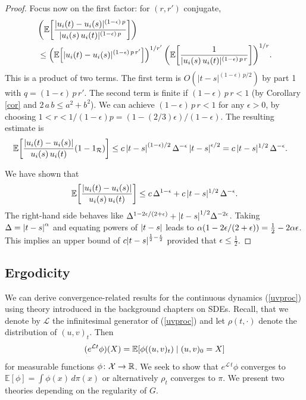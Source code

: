 \documentclass[11pt, twoside]{report}
\begin{document}
\begin{proof}
Focus now on the first factor: for $(r,r')$ conjugate,
\begin{align*}
&\pp{\mathbb{E} \bp{\frac {|u_i(t)-u_i(s)|^{(1-\epsilon)\,p}}{|u_i(s)\,u_i(t)|^{(1-\epsilon)\,p}}}}\\
&\le \pp{\mathbb{E} \bp{ {|u_i(t)-u_i(s)|^{(1-\epsilon)\,p\,r'}}}}^{1/r'}\, \pp{\mathbb{E} \bp{\frac {1}{|u_i(s)\,u_i(t)|^{(1-\epsilon)\,p \,r}}}}^{1/r}.
\end{align*}
This is a product of two terms. The first term is $O(|t-s|^{(1-\epsilon)\,p/2})$ by part 1 with  $q=(1-\epsilon)\,p\, r'$.
   The second term is finite if $(1-\epsilon) \,p\, r<1$ (by Corollary \ref{cor} and $2\,a\,b\le a^2+b^2$).
We can achieve $(1-\epsilon)\,p\,r<1$ for any $\epsilon>0$, by choosing $1<r<1/(1-\epsilon)p=(1-(2/3)\epsilon)/(1-\epsilon)$. The resulting estimate is
 \begin{align*}
  \mathbb{E} \bp{\frac {|u_i(t)-u_i(s)|}{u_i(s)\,u_i(t)} (1-1_{\mathcal R})}
 &\le c\, \abs{t-s}^{(1-\epsilon)/2}\, \Delta ^{-\epsilon}\, \abs{t-s}^{\epsilon/2}
 = c\,|t-s|^{1/2}\, \Delta^{-\epsilon}.
 \end{align*}

    We have shown that
       \[\mathbb{E} \bp{\frac {|u_i(t)-u_i(s)|}{u_i(s)\,u_i(t)}} 
     \le  c \,\Delta^{1-\epsilon} +c\,|t-s|^{1/2} \,\Delta^{-\epsilon}.
     \]
     The right-hand side behaves like $\Delta^{1-2\epsilon/(2+\epsilon)} + \abs{t-s}^{1/2}\Delta^{-2\epsilon}$. Taking $\Delta = \left\lvert t-s\right\rvert^\alpha$ and equating powers of $\left\lvert t-s\right\rvert$ leads to $\alpha\pa{1-2\epsilon/(2+\epsilon)} = \frac12 - 2\alpha \epsilon$. This implies an upper bound of $c \abs{t-s}^{\frac12 - \frac{\epsilon}{2}}$ provided that $\epsilon \leq \frac12$. 
\end{proof}

\subsection{Ergodicity}
We can derive convergence-related results for the continuous dynamics (\ref{uvproc}) using theory introduced in the background chapters on SDEs. Recall, that we denote by $\mathcal L$ the infinitesimal generator of (\ref{uvproc}) and let $\rho(t,\cdot)$ denote the distribution of $(u,v)_t$.
Then \[(e^{\mathcal L  t}\phi)(X)=\mean{\phi((u,v)
_t) \mid (u,v)_0=X}\] for measurable functions $\phi\colon \mathcal X\to\mathbb{R}$. We seek to show 
that $e^{\mathcal L \,t }\phi$ converges to $\mathbb{E}[\phi]=\int \phi(x)\,d\pi(x)$ or alternatively $\rho_t$ converges to $\pi$. We present two theories depending on the regularity of $G$.
\end{document}
